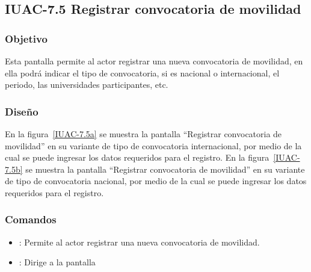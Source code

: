 \subsection{IUAC-7.5 Registrar convocatoria de movilidad}

\subsubsection{Objetivo}

Esta pantalla permite al actor  registrar una nueva convocatoria de movilidad, en ella podrá indicar el tipo de convocatoria, si es nacional o internacional, el periodo, las universidades participantes, etc.

\subsubsection{Diseño}

En la figura~\ref{IUAC-7.5a} se muestra la pantalla ``Registrar convocatoria de movilidad'' en su variante de tipo de convocatoria internacional, por medio de la cual se puede ingresar los datos requeridos para el registro. 
En la figura~\ref{IUAC-7.5b} se muestra la pantalla ``Registrar convocatoria de movilidad'' en su variante de tipo de convocatoria nacional, por medio de la cual se puede ingresar los datos requeridos para el registro. \\


\subsubsection{Comandos}
\begin{itemize}
	\item {}: Permite al actor registrar una nueva convocatoria de movilidad.
	\item {}: Dirige a la pantalla 
\end{itemize}